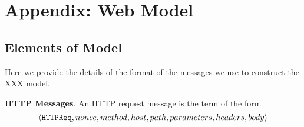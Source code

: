 \appendix
\section{Appendix: Web Model}
\label{sec:appendix}
\subsection{Elements of Model}
Here we provide the details of the format of the messages we use to construct the XXX model.

\vspace{1mm}\noindent\textbf{HTTP Messages}.
An HTTP request message is the term of the form
\begin{equation*}
\setlength{\abovedisplayskip}{1pt}
\setlength{\belowdisplayskip}{1pt}
\langle \mathtt{HTTPReq}, nonce, method, host, path, parameters, headers, body\rangle
\end{equation*}

